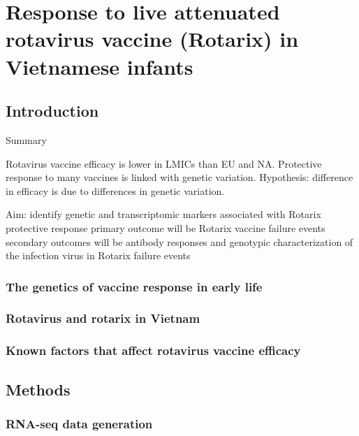 %
%

\chapter{Response to live attenuated rotavirus vaccine (Rotarix) in Vietnamese infants}

\section{Introduction}

Summary 

Rotavirus vaccine efficacy is lower in LMICs than EU and NA.
Protective response to many vaccines is linked with genetic variation.
Hypothesis: difference in efficacy is due to differences in genetic variation.

Aim:
    identify genetic and transcriptomic markers associated with Rotarix protective response
    primary outcome will be Rotarix vaccine failure events 
    secondary outcomes will be antibody responses and genotypic characterization of the infection virus in Rotarix failure events

\subsection{The genetics of vaccine response in early life}


\subsection{Rotavirus and rotarix in Vietnam}

\subsection{Known factors that affect rotavirus vaccine efficacy}

\section{Methods}

\subsection{RNA-seq data generation}

